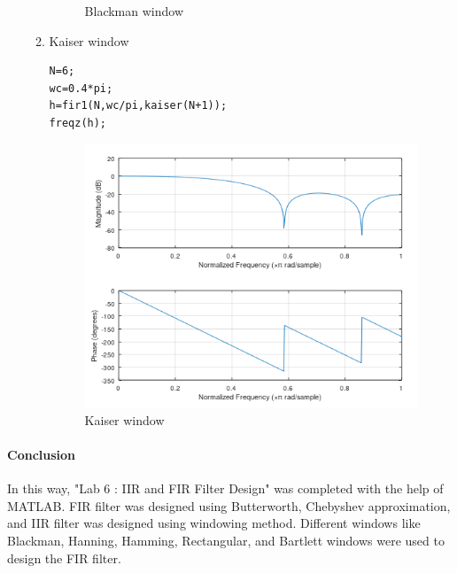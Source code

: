 \documentclass[12pt]{article}
\begin{document}
\begin{enumerate}
\begin{enumerate}
\begin{figure}[h!]
        \caption{Blackman window}
    \end{figure}
    \pagebreak
    \item Kaiser window
    \begin{Verbatim}[frame = single]
N=6;
wc=0.4*pi;
h=fir1(N,wc/pi,kaiser(N+1));
freqz(h);
    \end{Verbatim}
    \begin{figure}[h!]
        \centering
        \includegraphics{labss/Lab6_5f.PNG}
        \caption{Kaiser window}
    \end{figure}
    \pagebreak
\end{enumerate}
\end{enumerate}
\paragraph{Conclusion\\}
In this way, "Lab 6 : IIR and FIR Filter Design" was completed with the help of MATLAB.
FIR filter was designed using Butterworth, Chebyshev approximation, and IIR filter was
designed using windowing method. Different windows like Blackman, Hanning, Hamming,
Rectangular, and Bartlett windows were used to design the FIR filter.
\end{document}
